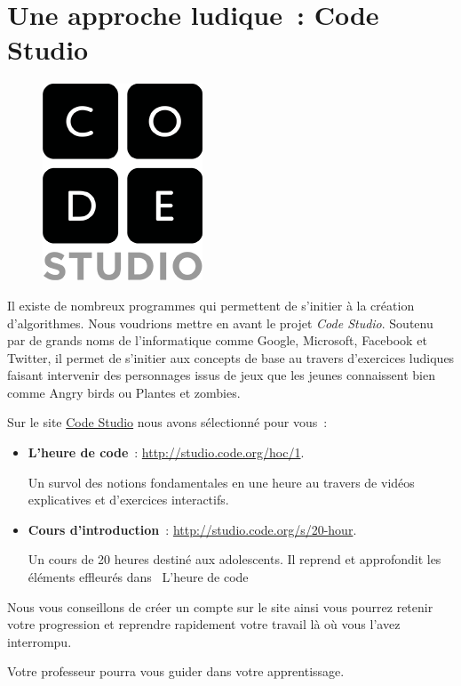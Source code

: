 \chapter{Une approche ludique~: Code Studio}
\label{codestudio}

	\begin{figure}
	\vskip-4mm
	\includegraphics[scale=0.2]{images/codeorg-studio-logo.png}
	\vskip-2mm
	\end{figure}
	
	Il existe de nombreux programmes 
	qui permettent de s’initier à la création d’algorithmes.
	Nous voudrions mettre en avant le projet \emph{Code Studio}.
	Soutenu par de grands noms de l’informatique 
	comme \textsf{Google}, \textsf{Microsoft}, 
	\textsf{Facebook} et \textsf{Twitter},
	il permet de s’initier aux concepts de base
	au travers d’exercices ludiques faisant intervenir 
	des personnages issus de jeux que les jeunes connaissent bien 
	comme \textsf{Angry birds} ou \textsf{Plantes et zombies}.
	
	Sur le site \href{http://studio.code.org/}{Code Studio} 
	nous avons sélectionné pour vous~:

	\begin{itemize}
	\item
		\textbf{L’heure de code}~: 
		\url{http://studio.code.org/hoc/1}.
		
		Un survol des notions fondamentales en une heure
		au travers de vidéos explicatives et d’exercices interactifs.
	\item
		\textbf{Cours d’introduction}~: 
		\url{http://studio.code.org/s/20-hour}.
		
		Un cours de 20 heures destiné aux adolescents.
		Il reprend et approfondit les éléments effleurés dans
		\og\ L’heure de code\fg	
	\end{itemize}
	
	Nous vous conseillons de créer un compte sur le site
	ainsi vous pourrez retenir votre progression
	et reprendre rapidement votre travail là où vous l’avez
	interrompu.
	
	Votre professeur pourra vous guider dans votre apprentissage.
	
